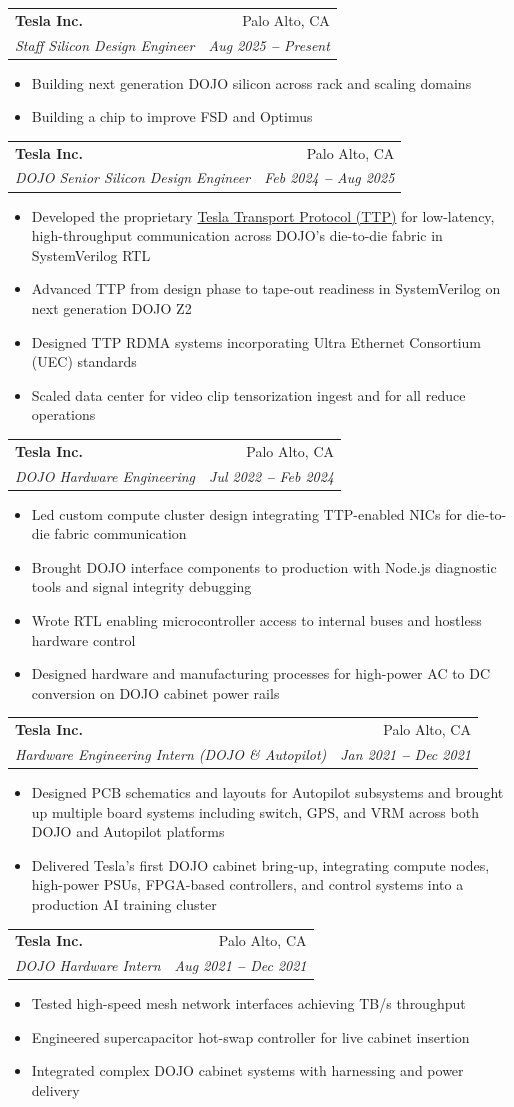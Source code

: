 \documentclass[letterpaper,11pt]{article}
\makeatletter
\newcommand{\resumeItem}[1]{
  \item\small{
    {#1 \vspace{-2pt}}
  }
}
\newcommand{\resumeSubheading}[4]{
  \vspace{-2pt}\item
    \begin{tabular*}{0.97\textwidth}[t]{l@{\extracolsep{\fill}}r}
      \textbf{#1} & #2 \\
      \textit{\small#3} & \textit{\small #4} \\
    \end{tabular*}\vspace{-7pt}
}
\newcommand{\resumeItemListStart}{\begin{itemize}}
\newcommand{\resumeItemListEnd}{\end{itemize}\vspace{-5pt}}
\makeatother
\begin{document}
  \resumeSubheading
    {Tesla Inc.}{Palo Alto, CA}
    {Staff Silicon Design Engineer}{Aug 2025 \textbf{--} Present}
    \resumeItemListStart
      \resumeItem{Building next generation DOJO silicon across rack and scaling domains}
      \resumeItem{Building a chip to improve FSD and Optimus}
    \resumeItemListEnd

  \resumeSubheading
    {Tesla Inc.}{Palo Alto, CA}
    {DOJO Senior Silicon Design Engineer}{Feb 2024 \textbf{--} Aug 2025}
    \resumeItemListStart
      \resumeItem{Developed the proprietary \href{https://patentimages.storage.googleapis.com/be/ad/28/d9a3cf28a032ae/WO2024039793A1.pdf}{Tesla Transport Protocol (TTP)} for low-latency, high-throughput communication across DOJO's die-to-die fabric in SystemVerilog RTL}
      \ifdefined\compactmode\else
      \resumeItem{Advanced TTP from design phase to tape-out readiness in SystemVerilog on next generation DOJO Z2}
      \resumeItem{Designed TTP RDMA systems incorporating Ultra Ethernet Consortium (UEC) standards}
      \resumeItem{Scaled data center for video clip tensorization ingest and for all reduce operations}
      \fi
    \resumeItemListEnd

  \resumeSubheading
    {Tesla Inc.}{Palo Alto, CA}
    {DOJO Hardware Engineering}{Jul 2022 \textbf{--} Feb 2024}
    \resumeItemListStart
      \resumeItem{Led custom compute cluster design integrating TTP-enabled NICs for die-to-die fabric communication}
      \resumeItem{Brought DOJO interface components to production with Node.js diagnostic tools and signal integrity debugging}
      \ifdefined\compactmode\else
      \resumeItem{Wrote RTL enabling microcontroller access to internal buses and hostless hardware control}
      \resumeItem{Designed hardware and manufacturing processes for high-power AC to DC conversion on DOJO cabinet power rails}
      \fi
    \resumeItemListEnd

  \ifdefined\compactmode
  \resumeSubheading
    {Tesla Inc.}{Palo Alto, CA}
    {Hardware Engineering Intern (DOJO \& Autopilot)}{Jan 2021 \textbf{--} Dec 2021}
    \resumeItemListStart
      \resumeItem{Designed PCB schematics and layouts for Autopilot subsystems and brought up multiple board systems including switch, GPS, and VRM across both DOJO and Autopilot platforms}
      \resumeItem{Delivered Tesla's first DOJO cabinet bring-up, integrating compute nodes, high-power PSUs, FPGA-based controllers, and control systems into a production AI training cluster}
    \resumeItemListEnd
  \else

  \resumeSubheading
    {Tesla Inc.}{Palo Alto, CA}
    {DOJO Hardware Intern}{Aug 2021 \textbf{--} Dec 2021}
    \resumeItemListStart
      \resumeItem{Tested high-speed mesh network interfaces achieving TB/s throughput}
      \resumeItem{Engineered supercapacitor hot-swap controller for live cabinet insertion}
      \resumeItem{Integrated complex DOJO cabinet systems with harnessing and power delivery}
    \resumeItemListEnd
\end{document}
